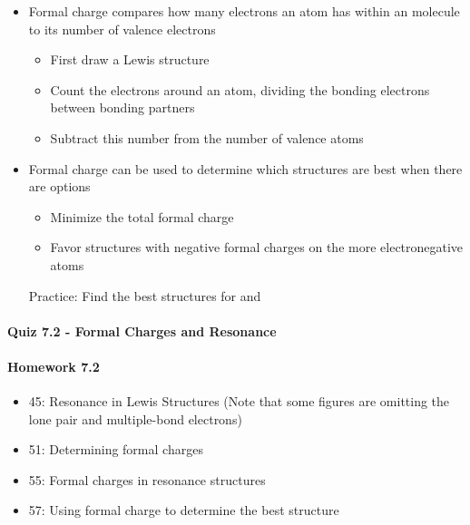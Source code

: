 \documentclass[12pt, openany, letterpaper]{memoir}
\begin{document}
\begin{itemize}
\begin{itemize}
            Practice: Draw the resonance structures and hybrid structure for  and 
      \item Formal charge compares how many electrons an atom has within an molecule to its number of valence electrons
            \begin{itemize}
              \item First draw a Lewis structure
              \item Count the electrons around an atom, dividing the bonding electrons between bonding partners
              \item Subtract this number from the number of valence atoms
            \end{itemize}
      \item Formal charge can be used to determine which structures are best when there are options
            \begin{itemize}
              \item Minimize the total formal charge
              \item Favor structures with negative formal charges on the more electronegative atoms
            \end{itemize}

            Practice: Find the best structures for  and 
    \end{itemize}
\end{itemize}

\paragraph*{Quiz 7.2 - Formal Charges and Resonance}
\paragraph*{Homework 7.2}
\begin{itemize}
  \item 45: Resonance in Lewis Structures (Note that some figures are omitting the lone pair and multiple-bond electrons)
  \item 51: Determining formal charges
  \item 55: Formal charges in resonance structures
  \item 57: Using formal charge to determine the best structure
\end{itemize}
\end{document}
